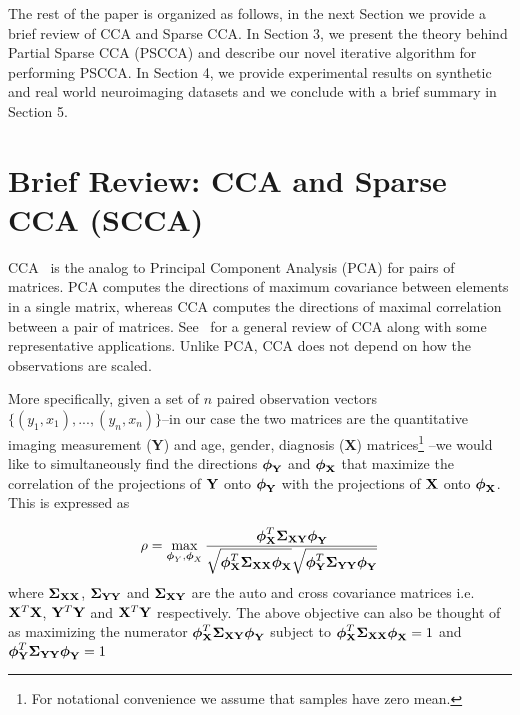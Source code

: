 \documentclass{llncs}
\newcommand{\X}{{\bf X}}
\newcommand{\Y}{{\bf Y}}
\newcommand{\bs}{\boldsymbol}
\begin{document}
The rest of the paper is organized as follows, in the next Section we provide a brief review of CCA and Sparse CCA. In Section 3, we present the theory behind Partial Sparse CCA (PSCCA) and describe our novel iterative algorithm for performing PSCCA. In Section 4, we provide experimental results on synthetic and real world neuroimaging datasets and we conclude with a brief summary in Section 5.




\section{Brief Review: CCA and Sparse CCA (SCCA)}

CCA~\cite{hotellingcca} is the analog to Principal
Component Analysis (PCA) for pairs of matrices. PCA
computes the directions of maximum covariance between elements in a
single matrix, whereas CCA computes the directions of maximal correlation
between a pair of matrices. 
See~\cite{taylor:cca} for a general review of CCA along with some representative applications. 
Unlike PCA, CCA does not depend on how the observations
are scaled.  

More specifically, given a set of $n$ paired observation vectors
$\{(y_1,x_1),...,(y_n,x_n)\}$--in our case the two matrices are the
quantitative imaging measurement ({\Y}) and age, gender, diagnosis ({\X}) matrices\footnote{For
  notational convenience we assume that samples have zero mean.} --we would like to simultaneously find the directions
${\bs{\bs\phi_{\Y}}}$ and
${\bs{\bs\phi_{\X}}}$ that maximize the correlation of
the projections of ${\Y}$ onto ${\bs{\bs\phi_{\Y}}}$
with the projections of ${\X}$ onto
${\bs{\bs\phi_{\X}}}$. This is expressed as

\begin{equation}
\label{cca1}
\rho=\max_{{\bs\phi_Y}, {\bs\phi_X}}
\frac{{\bs\phi_{\X}^T\bs\Sigma_{\X\Y}}\bs\phi_{\Y}}{\sqrt{\bs\phi_{\X}^T\bs\Sigma_{\X\X}\bs\phi_{\X}}\sqrt{\bs\phi_{\Y}^T\bs\Sigma_{\Y\Y}\bs\phi_{\Y}}}
\end{equation}
where ${\bs\Sigma_{\X\X}}$, ${\bs\Sigma_{\Y\Y}}$ and ${\bs\Sigma_{\X\Y}}$ are the auto and cross covariance matrices i.e. $\X^T\X$, $\Y^T\Y$ and $\X^T\Y$ respectively. The above objective can also be thought of as maximizing the numerator $\bs\phi_{\X}^T\bs\Sigma_{\X\Y}\bs\phi_{\Y}$ subject to $\bs\phi_{\X}^T\bs\Sigma_{\X\X}\bs\phi_{\X} =1$ and $\bs\phi_{\Y}^T\bs\Sigma_{\Y\Y}\bs\phi_{\Y}=1$
\end{document}
